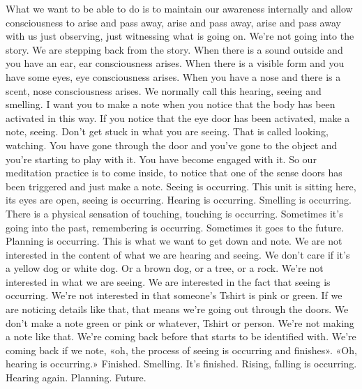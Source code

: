 \documentclass[letterpaper,10pt,english]{sphinxmanual}
\begin{document}
\sphinxAtStartPar
What we want to be able to do is to maintain our awareness internally
and allow consciousness to arise and pass away, arise and pass away, arise
and  pass  away  with  us  just  observing,  just  witnessing  what  is  going  on.
We’re not going into the story. We are stepping back from the story. When
there is a sound outside and you have an ear, ear consciousness arises. When
there is a visible form and you have some eyes, eye consciousness arises.
  When you have a nose and there is a scent, nose consciousness arises. We
normally call this hearing, seeing and smelling. I want you to make a note
when you notice that the body has been activated in this way. If you notice
that the eye door has been activated, make a note, seeing. Don’t get stuck
in  what  you  are  seeing.  That  is  called  looking,  watching.  You  have  gone
through the door and you’ve gone to the object and you’re starting to play
with it. You have become engaged with it. So our meditation practice is to
come inside, to notice that one of the sense doors has been triggered and just
make a note. Seeing is occurring. This unit is sitting here, its eyes are open,
seeing is occurring. Hearing is occurring. Smelling is occurring. There is a
physical sensation of touching, touching is occurring. Sometimes it’s going
into  the  past,  remembering  is  occurring.  Sometimes  it  goes  to  the  future.
Planning is occurring. This is what we want to get down and note. We are
not interested in the content of what we are hearing and seeing. We don’t care
if it’s a yellow dog or white dog. Or a brown dog, or a tree, or a rock. We’re
not interested in what we are seeing. We are interested in the fact that seeing
is occurring. We’re not interested in that someone’s T\sphinxhyphen{}shirt is pink or green.
If we are noticing details like that, that means we’re going out through the
doors. We don’t make a note green or pink or whatever, T\sphinxhyphen{}shirt or person.
We’re not making a note like that. We’re coming back before that starts to be
identified with. We’re coming back if we note, «oh, the process of seeing is
occurring and finishes». «Oh, hearing is occurring.» Finished. Smelling. It’s
finished. Rising, falling is occurring. Hearing again. Planning. Future.
\end{document}
